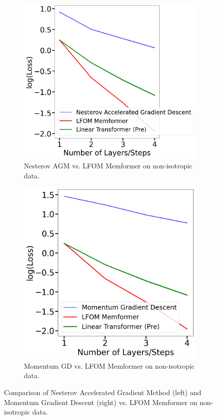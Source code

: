 \documentclass[11pt]{article}
\numberwithin{equation}{section}
\begin{document}
\begin{figure}[htbp]
  \centering
  \begin{subfigure}[b]{0.48\textwidth}
    \centering
    \includegraphics[width=\textwidth]{Nesterov_AGM_Experiments.png}
    \caption{Nesterov AGM vs. LFOM Memformer on non-isotropic data.}
    \label{fig:nag_vs_Memformer}
  \end{subfigure}
  \hfill
  \begin{subfigure}[b]{0.48\textwidth}
    \centering
    \includegraphics[width=\textwidth]{Momentum_GD_Experiment.png}
    \caption{Momentum GD vs. LFOM Memformer on non-isotropic data.}
    \label{fig:mgd_vs_Memformer}
  \end{subfigure}
  \caption{Comparison of Nesterov Accelerated Gradient Method (left) and Momentum Gradient Descent (right) vs. LFOM Memformer on non-isotropic data.}
  \label{fig:nag_mgd_comparison}
\end{figure}
\end{document}
